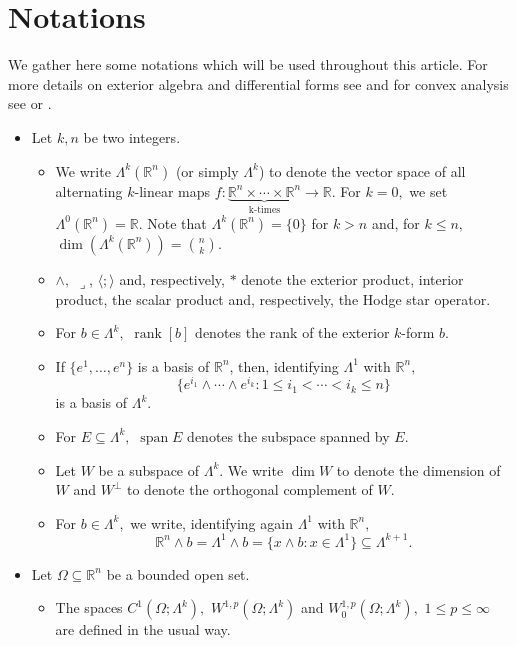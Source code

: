 \documentclass[11pt, a4paper, reqno]{amsart}
\numberwithin{equation}{section}
\newcommand{\spann}{\operatorname{span}}
\newcommand{\rank}{\operatorname{rank}}
\begin{document}
\section{Notations}
We gather here some notations which will be used throughout this article. For more details on exterior algebra and differential forms see \cite{csato2011pullback} and for convex analysis see \cite{DirectBernard} or \cite{Rockafellar}.
\begin{itemize}
\item [$(1)$] Let $k,n$ be two integers. 
   \begin{itemize}
    \item [$\bullet$] We write $\Lambda^k(\mathbb R^n)$ (or simply $\Lambda^k$) to denote the vector space of all alternating $k$-linear maps $f:\underbrace{\mathbb R^n \times \cdots \times \mathbb R^n }_{\textrm{k-times}}\to \mathbb R.$ For $k=0,$ we set $\Lambda^0(\mathbb R^n)=\mathbb R.$ Note that $\Lambda^k(\mathbb R^n)=\{0\}$ for $k>n$ and, for $k\leq n,$ $\dim \left(\Lambda^k(\mathbb R^n)\right)=\binom{n}{k}.$
    \item [$\bullet$] $\wedge,$ $\lrcorner$, $\langle;\rangle$ and, respectively, $*$ denote the exterior product, interior product, the scalar product and, respectively, the Hodge star operator.
    \item [$\bullet$] For $b\in \Lambda^k,$ $\rank[b]$ denotes the rank of the exterior $k$-form $b.$
    \item [$\bullet$] If $\{e^1,\ldots, e^n\}$ is a basis of $\mathbb R^n$, then, identifying $\Lambda^1$ with $\mathbb R^n,$ $$\{e^{i_1}\wedge \cdots \wedge e^{i_k}:1\leq i_1<\cdots < i_k\leq n\}$$
    is a basis of $\Lambda^k.$
    \item [$\bullet$] For $E\subseteq \Lambda^k,$ $\spann E$ denotes the subspace spanned by $E.$
    \item [$\bullet$] Let $W$ be a subspace of $\Lambda^k$. We write $\dim W$ to denote the dimension of $W$ and $W^{\perp}$ to denote the orthogonal complement of $W.$
    \item [$\bullet$] For $b\in \Lambda^k,$ we write, identifying again $\Lambda^1$ with $\mathbb R^n,$ $$\mathbb R^n \wedge b=\Lambda^1\wedge b=\{x\wedge b:x\in \Lambda^1\}\subseteq \Lambda^{k+1}.$$
   \end{itemize}
   \item [(2)] Let $\Omega \subseteq \mathbb R^n$ be a bounded open set. 
   \begin{itemize}
       \item [$\bullet$] The spaces $C^1(\Omega; \Lambda^k),$ $W^{1,p}(\Omega;\Lambda^k)$ and $W^{1,p}_{0}(\Omega;\Lambda^k),$ $1\leq p\leq \infty$ are defined in the usual way.

\end{itemize}
\end{itemize}
\end{document}
